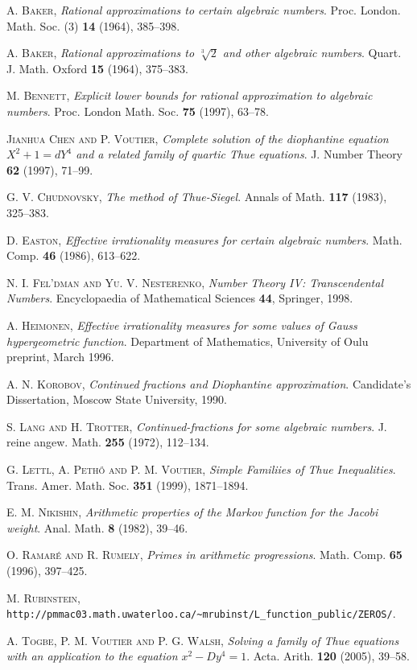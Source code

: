 \documentclass{jT}
\theoremstyle{definition}
\begin{document}
\begin{thebibliography}{99}

\textsc{A. Baker},
\textit{Rational approximations to certain algebraic numbers}. 
Proc. London. Math. Soc. (3) {\bf 14} (1964), 385--398. 

\textsc{A. Baker},
\textit{Rational approximations to $\sqrt[3]{2}$ and other algebraic numbers}.
Quart. J. Math. Oxford {\bf 15} (1964), 375--383. 

\textsc{M. Bennett},
\textit{Explicit lower bounds for rational approximation to algebraic numbers}.
Proc. London Math. Soc. {\bf 75} (1997), 63--78. 

\textsc{Jianhua Chen and P. Voutier},
\textit{Complete solution of the diophantine equation $X^{2}+1=dY^{4}$ and a related family of quartic Thue equations}.
J. Number Theory {\bf 62} (1997), 71--99.

\textsc{G. V. Chudnovsky},
\textit{The method of Thue-Siegel}.
Annals of Math. {\bf 117} (1983), 325--383. 

\textsc{D. Easton},
\textit{Effective irrationality measures for certain algebraic numbers}.
Math. Comp. {\bf 46} (1986), 613--622. 

\textsc{N. I. Fel'dman and Yu. V. Nesterenko},
\textit{Number Theory IV: Transcendental Numbers}.
Encyclopaedia of Mathematical Sciences {\bf 44}, Springer, 1998.

\textsc{A. Heimonen},
\textit{Effective irrationality measures for some values of Gauss hypergeometric function}.
Department of Mathematics, University of Oulu preprint, March 1996.  

\textsc{A. N. Korobov},
\textit{Continued fractions and Diophantine approximation}.
Candidate's Dissertation, Moscow State University, 1990.

\textsc{S. Lang and H. Trotter},
\textit{Continued-fractions for some algebraic numbers}.
J. reine angew. Math. {\bf 255} (1972), 112--134.

\textsc{G. Lettl, A. Peth\H{o} and P. M. Voutier},
\textit{Simple Familiies of Thue Inequalities}.
Trans. Amer. Math. Soc. {\bf 351} (1999), 1871--1894.

\textsc{E. M. Nikishin},
\textit{Arithmetic properties of the Markov function for the Jacobi weight}.
Anal. Math. {\bf 8} (1982), 39--46.

\textsc{O. Ramar\'{e} and R. Rumely},
\textit{Primes in arithmetic progressions}.
Math. Comp. {\bf 65} (1996), 397--425. 

\textsc{M. Rubinstein},
\verb+http://pmmac03.math.uwaterloo.ca/~mrubinst/L_function_public/ZEROS/+.

\textsc{A. Togbe, P. M. Voutier and P. G. Walsh},
\textit{Solving a family of Thue equations with an application to the equation $x^{2}-Dy^{4}=1$}.
Acta. Arith. {\bf 120} (2005), 39--58. 

\end{thebibliography}
\end{document}
